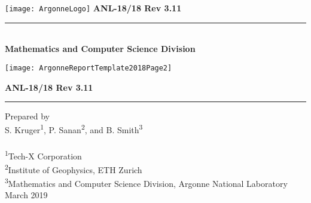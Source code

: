 
%



\def\shortintro{false}

\usepackage{fancyhdr,lastpage}
\pagestyle{fancy}



\pagestyle{empty}
\hspace{-.65in}\texttt{[image: ArgonneLogo]}
\hfill  {\large {\bf ANL-18/18 Rev 3.11}}

\vspace*{2in}
\vspace*{8pt}
\hrule
\vspace*{8pt}

\vspace*{1in}
\noindent \\
{\Large {\bf Mathematics and Computer Science Division}}

\vspace*{10pt}
\vspace*{20pt}



\newpage
\centerline{\texttt{[image: ArgonneReportTemplate2018Page2]}}
\newpage

\hfill {\large {\bf ANL-18/18 Rev 3.11}}

\vspace*{2in}
\vspace*{8pt}
\hrule
\vspace*{8pt}

\vspace*{0.5in}
\noindent Prepared by \\
{S. Kruger\textsuperscript{1}, P. Sanan\textsuperscript{2}, and B. Smith\textsuperscript{3}}\\
\\
\textsuperscript{1}Tech-X Corporation \\
\textsuperscript{2}Institute of Geophysics, ETH Zurich\\
\textsuperscript{3}Mathematics and Computer Science Division, Argonne National Laboratory \\

\vspace*{30pt}
\noindent March 2019

